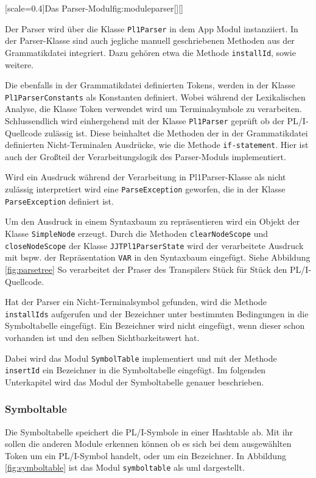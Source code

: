 [scale=0.4]{Das Parser-Modul}{fig:moduleparser}[][]
\pagebreak

Der Parser wird über die Klasse \verb+Pl1Parser+ in dem App Modul instanziiert. In der Parser-Klasse sind auch jegliche manuell geschriebenen Methoden aus der Grammatikdatei integriert. 
Dazu gehören etwa die Methode \verb+installId+, sowie weitere. 

Die ebenfalls in der Grammatikdatei definierten Tokens, 
werden in der Klasse \verb+Pl1ParserConstants+ als Konstanten definiert. 
Wobei während der Lexikalischen Analyse, die Klasse Token verwendet wird um Terminalsymbole zu verarbeiten. 
Schlussendlich wird einhergehend mit der Klasse \verb+Pl1Parser+ geprüft ob der PL/I-Quellcode zulässig ist. 
Diese beinhaltet die Methoden der in der Grammatikdatei definierten Nicht-Terminalen Ausdrücke, wie die Methode \verb+if-statement+. 
Hier ist auch der Großteil der Verarbeitungslogik des Parser-Moduls implementiert.

Wird ein Ausdruck während der Verarbeitung in Pl1Parser-Klasse als nicht zulässig  interpretiert wird eine \verb+ParseException+ geworfen, die in der Klasse \verb+ParseException+ definiert ist.

Um den Ausdruck in einem Syntaxbaum zu repräsentieren wird ein Objekt der Klasse \verb+SimpleNode+ erzeugt. Durch die Methoden \verb+clearNodeScope+ und \verb+closeNodeScope+ der Klasse \verb+JJTPl1ParserState+ wird der verarbeitete Ausdruck mit bspw. der Repräsentation \verb+VAR+ in den Syntaxbaum eingefügt. 
Siehe Abbildung \ref{fig:parsetree} So verarbeitet der Praser des Transpilers Stück für Stück den PL/I-Quellcode. 

Hat der Parser ein Nicht-Terminalsymbol gefunden, wird die Methode \verb+installIds+ aufgerufen und der Bezeichner unter bestimmten Bedingungen in die Symboltabelle eingefügt. 
Ein Bezeichner wird nicht eingefügt, 
wenn dieser schon vorhanden ist und den selben Sichtbarkeitswert hat.

Dabei wird das Modul \verb+SymbolTable+ implementiert und mit der Methode \verb+insertId+ ein Bezeichner in die Symboltabelle eingefügt. Im folgenden Unterkapitel wird das Modul der Symboltabelle genauer beschrieben. 

\pagebreak
\subsubsection{Symboltable}
Die Symboltabelle speichert die PL/I-Symbole in einer Hashtable ab. Mit ihr sollen die anderen Module
erkennen können ob es sich bei dem ausgewählten Token um ein PL/I-Symbol handelt, oder um ein Bezeichner.
In Abbildung \ref{fig:symboltable} ist das Modul \verb+symboltable+ als \ac{uml} dargestellt.

